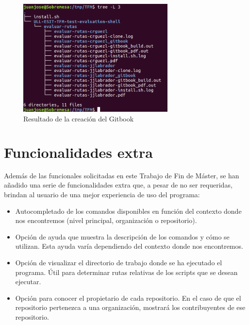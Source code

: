 		\begin{figure}[H]
		\begin{center}
		\includegraphics[width=0.7\textwidth]{images/ghshell8-2}
		\caption{Resultado de la creación del Gitbook}
		\label{fig:ghshell8-2}
		\end{center}
		\end{figure}
		
\newpage
\section{Funcionalidades extra}
\label{3:sec:2}

Además de las funcionales solicitadas en este Trabajo de Fin de Máster, se han añadido una serie de funcionalidades extra que, a pesar de no ser requeridas, brindan al usuario de una mejor experiencia de uso del programa:

\begin{itemize}
  \item Autocompletado de los comandos disponibles en función del contexto donde nos encontremos (nivel principal, organización o repositorio).
	\item Opción de ayuda que muestra la descripción de los comandos y cómo se utilizan. Esta ayuda varía dependiendo del contexto donde nos encontremos.
	\item Opción de visualizar el directorio de trabajo donde se ha ejecutado el programa. Útil para determinar rutas relativas de los scripts que se desean ejecutar.
	\item Opción para conocer el propietario de cada repositorio. En el caso de que el repositorio pertenezca a una organización, mostrará los contribuyentes de ese repositorio.
\end{itemize}

